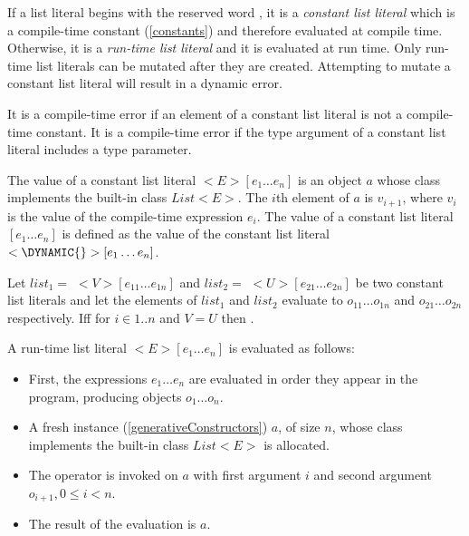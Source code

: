 \documentclass{article}
\begin{document}
\LMHash{}
If a list literal begins with the reserved word \CONST{}, it is a {\em constant list literal} which is a compile-time constant (\ref{constants}) and therefore evaluated at compile time.
Otherwise, it is a {\em run-time list literal} and it is evaluated at run time.
Only run-time list literals can be mutated
after they are created.
Attempting to mutate a constant list literal will result in a dynamic error.

\LMHash{}
It is a compile-time error if an element of a constant list literal is not a compile-time constant.
It is a compile-time error if the type argument of a constant list literal includes a type parameter.

\LMHash{}
The value of a constant list literal \CONST{} $<E>[e_1\ldots e_n]$ is an object $a$ whose class implements the built-in class $List<E>$.
The $i$th element of $a$ is $v_{i+1}$, where $v_i$ is the value of the compile-time expression $e_i$.
The value of a constant list literal \CONST{} $[e_1 \ldots e_n]$ is defined as the value of the constant list literal \CONST{}$ < \DYNAMIC{}>[e_1\ldots e_n]$.

\LMHash{}
Let $list_1 =$ \CONST{} $<V>[e_{11} \ldots e_{1n}]$ and $list_2 =$ \CONST{} $<U>[e_{21} \ldots e_{2n}]$ be two constant list literals and let the elements of $list_1$ and $list_2$ evaluate to $o_{11} \ldots o_{1n}$ and $o_{21} \ldots o_{2n}$ respectively.
If{}f  for $i \in 1 .. n$ and $V = U$ then .


\LMHash{}
A run-time list literal $<E>[e_1 \ldots e_n]$ is evaluated as follows:
\begin{itemize}
\item
First, the expressions $e_1 \ldots e_n$ are evaluated in order they appear in the program, producing objects $o_1 \ldots o_n$.
\item A fresh instance (\ref{generativeConstructors}) $a$, of size $n$, whose class implements the built-in class $List<E>$ is allocated.
\item
The operator \code{[]=} is invoked on $a$ with first argument $i$ and second argument
$o_{i+1}, 0 \le i < n$.
\item
The result of the evaluation is $a$.
\end{itemize}
\end{document}

